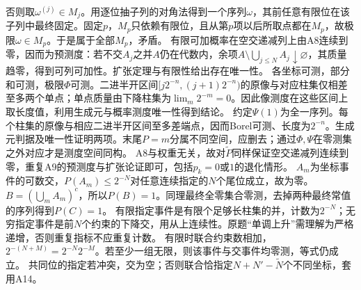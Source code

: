 \documentclass[UTF8,fontset=fandol,11pt]{ctexart}
\begin{document}
否则取$\omega^{(j)}\in M_j$。用逐位抽子列的对角法得到一个序列$\omega$，其前任意有限位在该子列中最终固定。固定$p$，$M_p$只依赖有限位，且从第$p$项以后所取点都在$M_p$，故极限$\omega\in M_p$。于是属于全部$M_p$，矛盾。
有限可加概率在空交递减列上由A8连续到零，因而为预测度：若不交$A_j$之并$A$仍在代数内，余项$A\setminus\bigcup_{j\le N}A_j\downarrow\varnothing$，其质量趋零，得到可列可加性。扩张定理与有限性给出存在唯一性。
各坐标可测，部分和可测，极限$\Phi$可测。二进半开区间$[j2^{-n},(j+1)2^{-n})$的原像与对应柱集仅相差至多两个单点；单点质量由下降柱集为$\lim_m2^{-m}=0$。因此像测度在这些区间上取长度值，利用生成元与概率测度唯一性得到结论。
约定$\Psi(1)$为全一序列。每个柱集的原像与相应二进半开区间至多差端点，因而Borel可测、长度为$2^{-n}$。生成元判据及唯一性证明两项。末尾$P=m$分属不同空间，应删去；通过$\Phi,\Psi$在零测集之外对应才是测度空间同构。
A8与权重无关，故对$\widetilde P$同样保证空交递减列连续到零，重复A9的预测度与扩张论证即可，包括$p_k=0$或$1$的退化情形。
$A_m$为坐标事件的可数交，$P(A_m)\le2^{-N}$对任意连续指定的$N$个尾位成立，故为零。$B=(\bigcup_mA_m)^c$，所以$P(B)=1$。同理最终全零集合零测，去掉两种最终常值的序列得到$P(C)=1$。
有限指定事件是有限个足够长柱集的并，计数为$2^{-N}$；无穷指定事件是前$N$个约束的下降交，用从上连续性。原题“单调上升”需理解为严格递增，否则重复指标不应重复计数。
有限时联合约束数相加，$2^{-(N+M)}=2^{-N}2^{-M}$。若至少一组无限，则该事件与交事件均零测，等式仍成立。
共同位的指定若冲突，交为空；否则联合恰指定$N+N'-\widetilde N$个不同坐标，套用A14。
\end{document}
